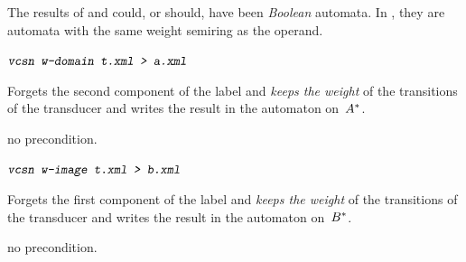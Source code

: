 \Cave 
The results of  and  could, or should, have 
been \emph{Boolean} automata.
In \tafkitv, they are automata with the same weight semiring as the 
operand.


\begin{SwClCmd}
\begin{shell}
$ \textsl{\texttt{vcsn w-domain t.xml > a.xml}}
$
\end{shell}%
\end{SwClCmd}%
\begin{SwClTxt}
    Forgets the second component of the label and \emph{keeps the weight} of the 
    transitions of the transducer  
     and writes the result in the automaton
     on~${{A}^{*}}$. 
\end{SwClTxt}%
%

\Prec no precondition.

\medskip\medskip 
\begin{SwClCmd}
\begin{shell}
$ \textsl{\texttt{vcsn w-image t.xml > b.xml}}
$
\end{shell}%
\end{SwClCmd}%
\begin{SwClTxt}
    Forgets the first component of the label and \emph{keeps the weight} of the 
    transitions of the transducer  
     and writes the result in the automaton
     on~${{B}^{*}}$. 
\end{SwClTxt}%
%

\Prec no precondition.

